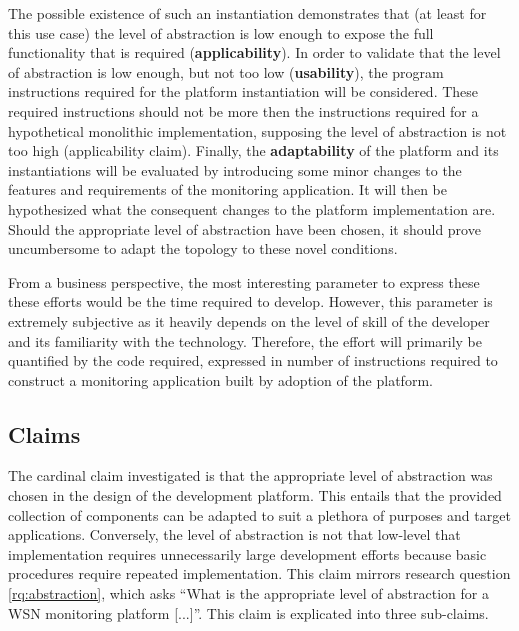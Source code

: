 The possible existence of such an instantiation demonstrates that (at least for this use case) the level of abstraction is low enough to expose the full functionality that is required  (\textbf{applicability}). In order to validate that the level of abstraction is low enough, but not too low (\textbf{usability}), the program instructions required for the platform instantiation will be considered. These required instructions should not be more then the instructions required for a hypothetical monolithic implementation, supposing the level of abstraction is not too high (applicability claim). Finally, the \textbf{adaptability} of the platform and its instantiations will be evaluated by introducing some minor changes to the features and requirements of the monitoring application. It will then be hypothesized what the consequent changes to the platform implementation are. Should the appropriate level of abstraction have been chosen, it should prove uncumbersome to adapt the topology to these novel conditions.

From a business perspective, the most interesting parameter to express these these efforts would be the time required to develop. However, this parameter is extremely subjective as it heavily depends on the level of skill of the developer and its familiarity with the technology. Therefore, the effort will primarily be quantified by the code required, expressed in number of instructions required to construct a monitoring application built by adoption of the platform.

\subsection{Claims}
\label{sec:claims}
The cardinal claim investigated is that the appropriate level of abstraction was chosen in the design of the development platform. This entails that the provided collection of components can be adapted to suit a plethora of purposes and target applications. Conversely, the level of abstraction is not that low-level that implementation requires unnecessarily large development efforts because basic procedures require repeated implementation. This claim mirrors research question \ref{rq:abstraction}, which asks ``What is the appropriate level of abstraction for a WSN monitoring platform [...]''. This claim is explicated into three sub-claims.

